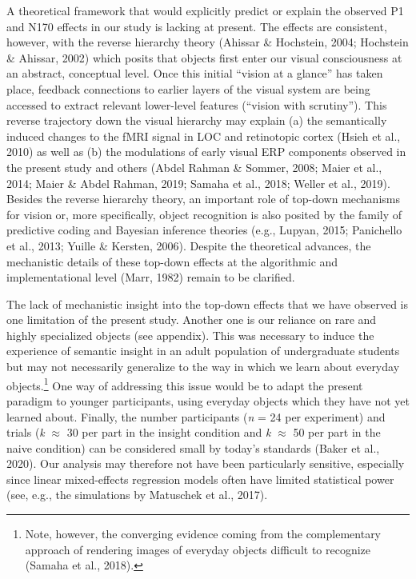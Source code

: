 \documentclass[
  english,
  man,floatsintext]{apa7}
\begin{document}
A theoretical framework that would explicitly predict or explain the observed P1 and N170 effects in our study is lacking at present. The effects are consistent, however, with the reverse hierarchy theory (Ahissar \& Hochstein, 2004; Hochstein \& Ahissar, 2002) which posits that objects first enter our visual consciousness at an abstract, conceptual level. Once this initial \enquote{vision at a glance} has taken place, feedback connections to earlier layers of the visual system are being accessed to extract relevant lower-level features (\enquote{vision with scrutiny}). This reverse trajectory down the visual hierarchy may explain (a) the semantically induced changes to the fMRI signal in LOC and retinotopic cortex (Hsieh et al., 2010) as well as (b) the modulations of early visual ERP components observed in the present study and others (Abdel Rahman \& Sommer, 2008; Maier et al., 2014; Maier \& Abdel Rahman, 2019; Samaha et al., 2018; Weller et al., 2019). Besides the reverse hierarchy theory, an important role of top-down mechanisms for vision or, more specifically, object recognition is also posited by the family of predictive coding and Bayesian inference theories (e.g., Lupyan, 2015; Panichello et al., 2013; Yuille \& Kersten, 2006). Despite the theoretical advances, the mechanistic details of these top-down effects at the algorithmic and implementational level (Marr, 1982) remain to be clarified.

The lack of mechanistic insight into the top-down effects that we have observed is one limitation of the present study. Another one is our reliance on rare and highly specialized objects (see appendix). This was necessary to induce the experience of semantic insight in an adult population of undergraduate students but may not necessarily generalize to the way in which we learn about everyday objects.\footnote{Note, however, the converging evidence coming from the complementary approach of rendering images of everyday objects difficult to recognize (Samaha et al., 2018).} One way of addressing this issue would be to adapt the present paradigm to younger participants, using everyday objects which they have not yet learned about. Finally, the number participants (\emph{n} = 24 per experiment) and trials (\emph{k} \(\approx\) 30 per part in the insight condition and \emph{k} \(\approx\) 50 per part in the naive condition) can be considered small by today's standards (Baker et al., 2020). Our analysis may therefore not have been particularly sensitive, especially since linear mixed-effects regression models often have limited statistical power (see, e.g., the simulations by Matuschek et al., 2017).
\end{document}
